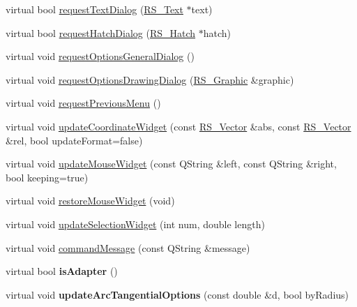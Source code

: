 \begin{DoxyCompactItemize}
\item 
virtual bool \hyperlink{classQG__DialogFactory_a068b97637497d03011ae6f578fcea1d2}{request\-Text\-Dialog} (\hyperlink{classRS__Text}{R\-S\-\_\-\-Text} $\ast$text)
\item 
virtual bool \hyperlink{classQG__DialogFactory_a91129b4c9d5f5c58d1daab7df4bbfbf9}{request\-Hatch\-Dialog} (\hyperlink{classRS__Hatch}{R\-S\-\_\-\-Hatch} $\ast$hatch)
\item 
virtual void \hyperlink{classQG__DialogFactory_a3102c5d9bf99a2fb9f16acf89f9ac20c}{request\-Options\-General\-Dialog} ()
\item 
virtual void \hyperlink{classQG__DialogFactory_a928828a3aabb386e5640a3a50e4ff67a}{request\-Options\-Drawing\-Dialog} (\hyperlink{classRS__Graphic}{R\-S\-\_\-\-Graphic} \&graphic)
\item 
virtual void \hyperlink{classQG__DialogFactory_ad948cc42909706407dcad08988c852ab}{request\-Previous\-Menu} ()
\item 
virtual void \hyperlink{classQG__DialogFactory_a7a749662d27c896adc5e4c225db83a8b}{update\-Coordinate\-Widget} (const \hyperlink{classRS__Vector}{R\-S\-\_\-\-Vector} \&abs, const \hyperlink{classRS__Vector}{R\-S\-\_\-\-Vector} \&rel, bool update\-Format=false)
\item 
virtual void \hyperlink{classQG__DialogFactory_a48cc8fb5248274676560af0f9e1edae0}{update\-Mouse\-Widget} (const Q\-String \&left, const Q\-String \&right, bool keeping=true)
\item 
virtual void \hyperlink{classQG__DialogFactory_ae1b3cb950123d66076fe228fb8dfb169}{restore\-Mouse\-Widget} (void)
\item 
virtual void \hyperlink{classQG__DialogFactory_af53709995af55dab2eca8b5ee653aebc}{update\-Selection\-Widget} (int num, double length)
\item 
virtual void \hyperlink{classQG__DialogFactory_a38c31d87d1e9f8e9d5228d6810c8394c}{command\-Message} (const Q\-String \&message)
\item 
\hypertarget{classQG__DialogFactory_a434fd630a491fb45d5b38e7688b1a6c3}{virtual bool {\bfseries is\-Adapter} ()}\label{classQG__DialogFactory_a434fd630a491fb45d5b38e7688b1a6c3}

\item 
\hypertarget{classQG__DialogFactory_a4e696cbb61ed6768ad146e19053502fc}{virtual void {\bfseries update\-Arc\-Tangential\-Options} (const double \&d, bool by\-Radius)}\label{classQG__DialogFactory_a4e696cbb61ed6768ad146e19053502fc}

\end{DoxyCompactItemize}
